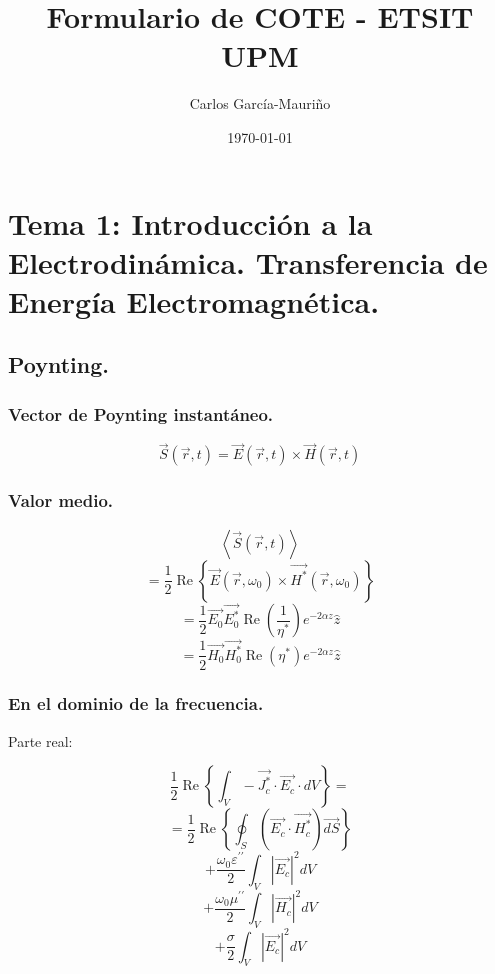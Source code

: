 \documentclass[12pt,a4paper]{article}
\title{Formulario de COTE - ETSIT UPM}
\author{Carlos García-Mauriño}
\date{\today}
\begin{document}
\maketitle

\twocolumn

\section{Tema 1: Introducción a la Electrodinámica. Transferencia de Energía Electromagnética.}

\subsection{Poynting.}
\label{sub:poynting}

\subsubsection{Vector de Poynting instantáneo.}
\label{ssub:vector_de_poynting_instantaneo}


\[ \vec{S} ( \vec{r}, t ) = \vec{E} ( \vec{r}, t ) \times \vec{H} ( \vec{r}, t
) \]

\subsubsection{Valor medio.}
\label{ssub:valor_medio}

\[ \left< \vec{S} ( \vec{r}, t ) \right> \]
\[ = \frac{1}{2} \operatorname{Re}\left\{ \vec{E}( \vec{r}, \omega_0 ) \times
\vec{H^*} ( \vec{r}, \omega_0)  \right\} \]
\[ = \frac{1}{2} \vec{E_0} \vec{E_0^*} \operatorname{Re}\left( \frac{1}{\eta^*}
\right) e^{-2 \alpha z} \hat{z} \]
\[ = \frac{1}{2} \vec{H_0} \vec{H_0^*} \operatorname{Re}\left( \eta^* \right)
e^{-2 \alpha z} \hat{z} \]

\subsubsection{En el dominio de la frecuencia.}
\label{ssub:en_el_dominio_de_la_frecuencia}

Parte real:

\[ \frac{1}{2} \operatorname{Re}\left\{ \int_V - \vec{J_{c}^*} \cdot
\vec{E_c} \cdot dV \right\} = \]
\[ = \frac{1}{2} \operatorname{Re}\left\{ \oint_S \left(\vec{E_{c}} \cdot
\vec{H_c^*} \right) \vec{dS} \right\} \] 
\[ + \frac{\omega_0 \varepsilon^{\prime\prime}}{2} \int_V | \vec{E_c} |^2 dV \]
\[ + \frac{\omega_0 \mu^{\prime\prime}}{2} \int_V | \vec{H_c} |^2 dV \]
\[ + \frac{\sigma}{2} \int_V | \vec{E_c} |^2 dV \]
\end{document}
